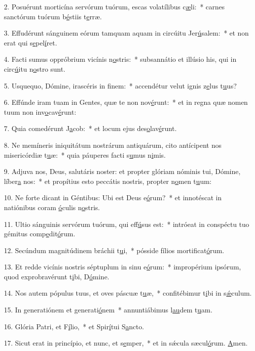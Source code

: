 2. Posuérunt morticína servórum tuórum, escas volatílibus c\uline{æ}li:~* carnes sanctórum tuórum b\uline{é}stiis t\uline{e}rræ.\par 
3. Effudérunt sánguinem eórum tamquam aquam in circúitu Jer\uline{ú}salem:~* et non erat qui s\uline{e}pel\uline{í}ret.\par 
4. Facti sumus oppróbrium vicínis n\uline{o}stris:~* subsannátio et illúsio his, qui in circ\uline{ú}itu n\uline{o}stro sunt.\par 
5. Usquequo, Dómine, irascéris in f\uline{i}nem:~* accendétur velut ignis z\uline{e}lus t\uline{u}us?\par 
6. Effúnde iram tuam in Gentes, quæ te non nov\uline{é}runt:~* et in regna quæ nomen tuum non inv\uline{o}cav\uline{é}runt:\par 
7. Quia comedérunt J\uline{a}cob:~* et locum ejus des\uline{o}lav\uline{é}runt.\par 
8. Ne memíneris iniquitátum nostrárum antiquárum, cito antícipent nos misericórdiæ t\uline{u}æ:~* quia páuperes facti s\uline{u}mus n\uline{i}mis.\par 
9. Adjuva nos, Deus, salutáris noster: et propter glóriam nóminis tui, Dómine, líber\uline{a} nos:~* et propítius esto peccátis nostris, propter n\uline{o}men t\uline{u}um:\par 
10. Ne forte dicant in Géntibus: Ubi est Deus e\uline{ó}rum?~* et innotéscat in natiónibus coram \uline{ó}culis n\uline{o}stris.\par 
11. Ultio sánguinis servórum tuórum, qui eff\uline{ú}sus est:~* intróeat in conspéctu tuo gémitus comp\uline{e}dit\uline{ó}rum.\par 
12. Secúndum magnitúdinem bráchii t\uline{u}i,~* pósside fílios mortif\uline{i}cat\uline{ó}rum.\par 
13. Et redde vicínis nostris séptuplum in sinu e\uline{ó}rum:~* impropérium ipsórum, quod exprobravérunt t\uline{i}bi, D\uline{ó}mine.\par 
14. Nos autem pópulus tuus, et oves páscuæ t\uline{u}æ,~* confitébimur t\uline{i}bi in s\uline{ǽ}culum.\par 
15. In generatiónem et generati\uline{ó}nem~* annuntiábimus l\uline{au}dem t\uline{u}am.\par 
16. Glória Patri, et F\uline{í}lio,~* et Spir\uline{í}tui S\uline{a}ncto.\par 
17. Sicut erat in princípio, et nunc, et s\uline{e}mper,~* et in sǽcula sæcul\uline{ó}rum. \uline{A}men.\par 
